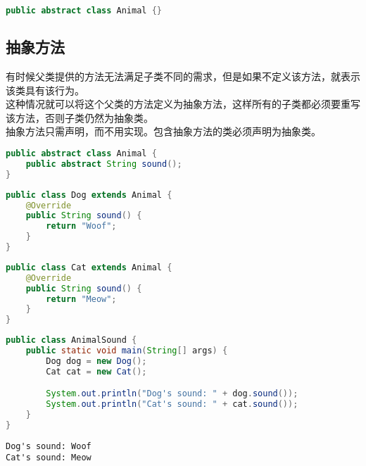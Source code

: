 \vspace{-0.5cm}

\begin{lstlisting}[language=Java]
public abstract class Animal {}
\end{lstlisting}

\vspace{0.5cm}

\subsection{抽象方法}

有时候父类提供的方法无法满足子类不同的需求，但是如果不定义该方法，就表示该类具有该行为。\\

这种情况就可以将这个父类的方法定义为抽象方法，这样所有的子类都必须要重写该方法，否则子类仍然为抽象类。\\

抽象方法只需声明，而不用实现。包含抽象方法的类必须声明为抽象类。\\


\begin{lstlisting}[language=Java]
public abstract class Animal {
    public abstract String sound();
}
\end{lstlisting}

\begin{lstlisting}[language=Java]
public class Dog extends Animal {
    @Override
    public String sound() {
        return "Woof";
    }
}
\end{lstlisting}

\begin{lstlisting}[language=Java]
public class Cat extends Animal {
    @Override
    public String sound() {
        return "Meow";
    }
}
\end{lstlisting}

\begin{lstlisting}[language=Java]
public class AnimalSound {
    public static void main(String[] args) {
        Dog dog = new Dog();
        Cat cat = new Cat();

        System.out.println("Dog's sound: " + dog.sound());
        System.out.println("Cat's sound: " + cat.sound());
    }
}
\end{lstlisting}

\begin{tcolorbox}
    \begin{verbatim}
Dog's sound: Woof
Cat's sound: Meow
	\end{verbatim}
\end{tcolorbox}

